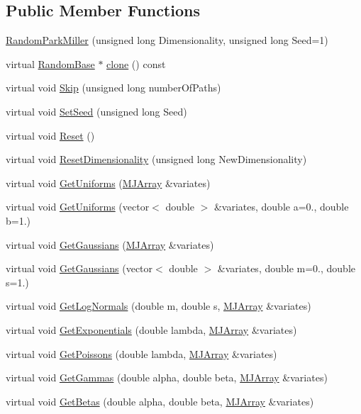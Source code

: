 \subsection*{Public Member Functions}
\begin{DoxyCompactItemize}
\item 
\hyperlink{classRandomParkMiller_a60884154bf954e8b5a7fcbcc41772cfd}{Random\+Park\+Miller} (unsigned long Dimensionality, unsigned long Seed=1)
\item 
virtual \hyperlink{classRandomBase}{Random\+Base} $\ast$ \hyperlink{classRandomParkMiller_abeadf7c9bd2549c604b56b4fbf05278d}{clone} () const
\item 
virtual void \hyperlink{classRandomParkMiller_a5a72cd434c23c8f79898b5fb5c455208}{Skip} (unsigned long number\+Of\+Paths)
\item 
virtual void \hyperlink{classRandomParkMiller_aff4bf7d5efe1b695c88372ff9f9fa46e}{Set\+Seed} (unsigned long Seed)
\item 
virtual void \hyperlink{classRandomParkMiller_a3149e8b0b8f2bba6b389325cd6d61cc0}{Reset} ()
\item 
virtual void \hyperlink{classRandomParkMiller_a2dff7d05b001445fe8e322f2bdc98ac7}{Reset\+Dimensionality} (unsigned long New\+Dimensionality)
\item 
virtual void \hyperlink{classRandomParkMiller_a3dbbbb95c40e2a8794659fa38630b784}{Get\+Uniforms} (\hyperlink{classMJArray}{M\+J\+Array} \&variates)
\item 
virtual void \hyperlink{classRandomParkMiller_a8662b99ba7a4a082d694f831cf6f43d8}{Get\+Uniforms} (vector$<$ double $>$ \&variates, double a=0., double b=1.)
\item 
virtual void \hyperlink{classRandomParkMiller_a7c7f7c1079bdf8462af5bcce3787ae03}{Get\+Gaussians} (\hyperlink{classMJArray}{M\+J\+Array} \&variates)
\item 
virtual void \hyperlink{classRandomParkMiller_adbc2537add4042bb4d0bb162f8d2b998}{Get\+Gaussians} (vector$<$ double $>$ \&variates, double m=0., double s=1.)
\item 
virtual void \hyperlink{classRandomParkMiller_ac9ecb9d60e18a611f4e4458cae09998c}{Get\+Log\+Normals} (double m, double s, \hyperlink{classMJArray}{M\+J\+Array} \&variates)
\item 
virtual void \hyperlink{classRandomParkMiller_a33b21750d1694fec01ed7c10d49e8fba}{Get\+Exponentials} (double lambda, \hyperlink{classMJArray}{M\+J\+Array} \&variates)
\item 
virtual void \hyperlink{classRandomParkMiller_adcc2619058ca8a30dab9618a54c82dd2}{Get\+Poissons} (double lambda, \hyperlink{classMJArray}{M\+J\+Array} \&variates)
\item 
virtual void \hyperlink{classRandomParkMiller_a819811663cba7da72678c0a05aae62ce}{Get\+Gammas} (double alpha, double beta, \hyperlink{classMJArray}{M\+J\+Array} \&variates)
\item 
virtual void \hyperlink{classRandomParkMiller_a100f104e3e067070906db8847be9b5d7}{Get\+Betas} (double alpha, double beta, \hyperlink{classMJArray}{M\+J\+Array} \&variates)
\end{DoxyCompactItemize}


